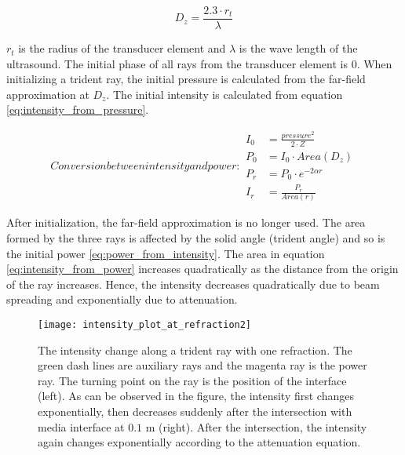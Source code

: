 \begin{equation} \label{eq:distancz}
    D_z=\frac{2.3 \cdot r_t}{\lambda}
\end{equation}

$r_t$ is the radius of the transducer element and $\lambda$ is the wave length of the ultrasound. The initial phase of all rays from the transducer element is 0. When initializing a trident ray, the initial pressure is calculated from the far-field approximation at $D_z$. The initial intensity is calculated from equation \ref{eq:intensity_from_pressure}.

\begin{subequations}
    Conversion between intensity and power:
    \begin{align} 
        I_0 &= \frac{pressure^2}{2 \cdot Z} \label{eq:intensity_from_pressure}\\
        P_0 &= I_0 \cdot Area(D_z) \label{eq:power_from_intensity}\\
        P_{r} &= P_0 \cdot e^{-2 \alpha r} \label{eq:power_decay}\\
        I_{r} &= \frac{P_r}{Area(r)} \label{eq:intensity_from_power}
    \end{align}
\end{subequations}

After initialization, the far-field approximation is no longer used. The area formed by the three rays is affected by the solid angle (trident angle) and so is the initial power \ref{eq:power_from_intensity}. The area in equation \ref{eq:intensity_from_power} increases quadratically as the distance from the origin of the ray increases. Hence, the intensity decreases quadratically due to beam spreading and exponentially due to attenuation. 

\begin{figure}[h]
    \centering
    \texttt{[image: intensity\_plot\_at\_refraction2]}
    \caption{The intensity change along a trident ray  with one refraction. The green dash lines are auxiliary rays and the magenta ray is the power ray. The turning point on the ray is the position of the interface (left). As can be observed in the figure, the intensity first changes exponentially, then decreases suddenly after the intersection with media interface at $0.1$ m (right). After the intersection, the intensity again changes exponentially according to the attenuation equation.}
    \label{fig:intensity_plot_at_refraction2}
\end{figure}

